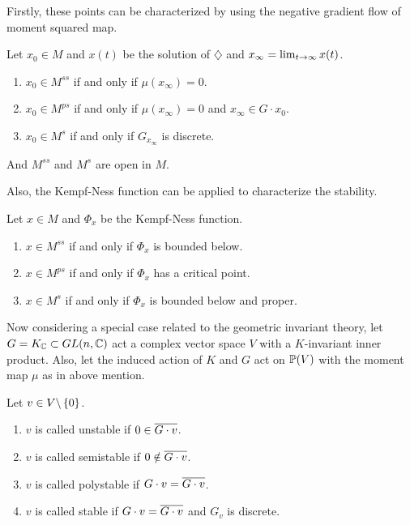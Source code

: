 \documentclass[a4paper,12pt]{article}
\begin{document}
	Firstly, these points can be characterized by using the negative gradient flow of moment squared map.

	\begin{thm}
		Let $x_0 \in M$ and $x(t)$ be the solution of $\diamondsuit$ and $x_{\infty} = \lim_{t \rightarrow \infty}x(t)$.
		\begin{enumerate}
			\item $x_0 \in M^{ss}$ if and only if $\mu(x_{\infty}) = 0$.
			\item $x_0 \in M^{ps}$ if and only if $\mu(x_{\infty}) = 0$ and $x_{\infty} \in G\cdot x_0$.
			\item $x_0 \in M^{s}$ if and only if $G_{x_{\infty}}$ is discrete.
		\end{enumerate}
		And $M^{ss}$ and $M^{s}$ are open in $M$.
	\end{thm}

	Also, the Kempf-Ness function can be applied to characterize the stability.
	\begin{thm}
		Let $x \in M$ and $\Phi_x$ be the Kempf-Ness function.
		\begin{enumerate}
			\item $x \in M^{ss}$ if and only if $\Phi_x$ is bounded below.
			\item $x \in M^{ps}$ if and only if $\Phi_x$ has a critical point.
			\item $x \in M^{s}$ if and only if $\Phi_x$ is bounded below and proper.
		\end{enumerate}
	\end{thm}

	Now considering a special case related to the geometric invariant theory, let $G = K_{\mathbb{C}} \subset GL(n,\mathbb{C})$ act a complex vector space $V$ with a $K$-invariant inner product. Also, let the induced action of $K$ and $G$ act on $\mathbb{P}(V)$ with the moment map $\mu$ as in above mention. 

	\begin{defn}
		Let $v \in V \backslash \left\{0\right\}$.
		\begin{enumerate}
			\item $v$ is called unstable if $0 \in \overline{G \cdot v}$.
			\item $v$ is called semistable if $0 \notin \overline{G \cdot v}$.
			\item $v$ is called polystable if $G \cdot v = \overline{G \cdot v}$.
			\item $v$ is called stable if $G \cdot v = \overline{G \cdot v}$ and $G_v$ is discrete.
		\end{enumerate}
	\end{defn}
\end{document}
